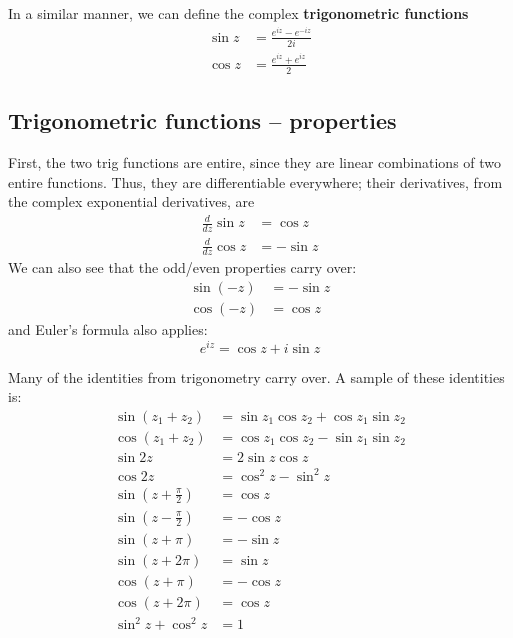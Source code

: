 \documentclass{article}
\renewcommand{\emph}{\textbf}
\begin{document}
In a similar manner, we can define the complex \emph{trigonometric functions}
\begin{align*}
	\sin z &= \frac{e^{iz} - e^{-iz}}{2i} \\
	\cos z &= \frac{e^{iz} + e^{ iz}}{2}
\end{align*}

\subsection{Trigonometric functions -- properties}
First, the two trig functions are entire, since they are linear combinations of two entire functions. Thus, they are differentiable everywhere; their derivatives, from the complex exponential derivatives, are
\begin{align*}
	\frac{d}{dz} \sin z &= \cos z \\
	\frac{d}{dz} \cos z &= -\sin z
\end{align*}
We can also see that the odd/even properties carry over:
\begin{align*}
	\sin(-z) &= - \sin z \\
	\cos(-z) &=   \cos z
\end{align*}
and Euler's formula also applies:
\[
	e^{iz} = \cos z + i \sin z
\]

Many of the identities from trigonometry carry over. A sample of these identities is:
\begin{align*}
	\sin(z_1 + z_2) &= \sin z_1 \cos z_2 + \cos z_1 \sin z_2 \\
	\cos(z_1 + z_2) &= \cos z_1 \cos z_2 - \sin z_1 \sin z_2 \\
	\sin 2z &= 2 \sin z \cos z \\
	\cos 2z &= \cos^2 z - \sin^2 z \\
	\sin \left( z + \frac{\pi}{2} \right) &=   \cos z \\
	\sin \left( z - \frac{\pi}{2} \right) &= - \cos z \\
	\sin (z +   \pi) &= -\sin z \\
	\sin (z + 2 \pi) &=  \sin z \\
	\cos (z +   \pi) &= -\cos z \\
	\cos (z + 2 \pi) &=  \cos z \\
	\sin^2 z + \cos^2 z &= 1
\end{align*}
\end{document}
